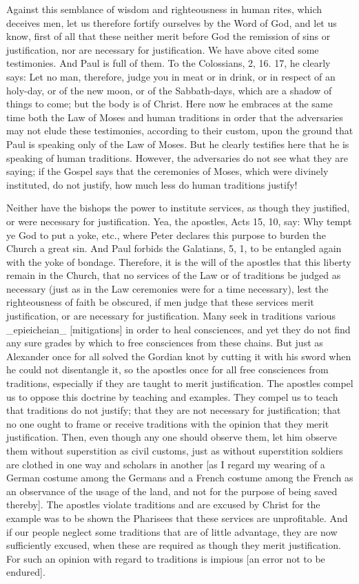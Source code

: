 Against this semblance of wisdom and righteousness in human rites,
which deceives men, let us therefore fortify ourselves by the Word of
God, and let us know, first of all that these neither merit before
God the remission of sins or justification, nor are necessary for
justification.  We have above cited some testimonies.  And Paul is
full of them.  To the Colossians, 2, 16. 17, he clearly says: Let no
man, therefore, judge you in meat or in drink, or in respect of an
holy-day, or of the new moon, or of the Sabbath-days, which are a
shadow of things to come; but the body is of Christ.  Here now he
embraces at the same time both the Law of Moses and human traditions
in order that the adversaries may not elude these testimonies,
according to their custom, upon the ground that Paul is speaking only
of the Law of Moses.  But he clearly testifies here that he is
speaking of human traditions.  However, the adversaries do not see
what they are saying; if the Gospel says that the ceremonies of Moses,
which were divinely instituted, do not justify, how much less do
human traditions justify!

Neither have the bishops the power to institute services, as though
they justified, or were necessary for justification.  Yea, the
apostles, Acts 15, 10, say: Why tempt ye God to put a yoke, etc.,
where Peter declares this purpose to burden the Church a great sin.
And Paul forbids the Galatians, 5, 1, to be entangled again with the
yoke of bondage.  Therefore, it is the will of the apostles that this
liberty remain in the Church, that no services of the Law or of
traditions be judged as necessary (just as in the Law ceremonies were
for a time necessary), lest the righteousness of faith be obscured,
if men judge that these services merit justification, or are
necessary for justification.  Many seek in traditions various
_epieicheian_ [mitigations] in order to heal consciences, and yet
they do not find any sure grades by which to free consciences from
these chains.  But just as Alexander once for all solved the Gordian
knot by cutting it with his sword when he could not disentangle it,
so the apostles once for all free consciences from traditions,
especially if they are taught to merit justification.  The apostles
compel us to oppose this doctrine by teaching and examples.  They
compel us to teach that traditions do not justify; that they are not
necessary for justification; that no one ought to frame or receive
traditions with the opinion that they merit justification.  Then,
even though any one should observe them, let him observe them without
superstition as civil customs, just as without superstition soldiers
are clothed in one way and scholars in another [as I regard my
wearing of a German costume among the Germans and a French costume
among the French as an observance of the usage of the land, and not
for the purpose of being saved thereby].  The apostles violate
traditions and are excused by Christ for the example was to be shown
the Pharisees that these services are unprofitable.  And if our
people neglect some traditions that are of little advantage, they are
now sufficiently excused, when these are required as though they
merit justification.  For such an opinion with regard to traditions
is impious [an error not to be endured].

